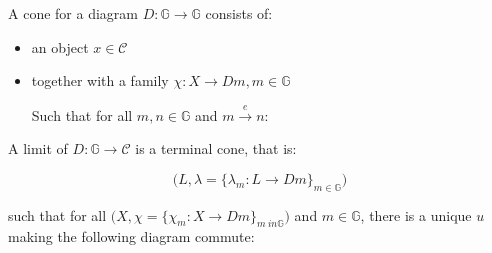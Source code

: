 \begin{definition}

A cone for a diagram $D:\mathbb{G} \to \mathbb{G}$ consists of:

\begin{itemize}
\item an object $x \in \mathcal{C}$
\item together with a family $\chi: X \to D m, m \in \mathbb{G}$

Such that for all $m, n \in \mathbb{G}$ and $m \xrightarrow{e} n$:

\begin{center}
\end{center}

\end{itemize}

A limit of $D: \mathbb{G} \to \mathcal{C}$ is a terminal cone, that is:

$$
\Big(L, \lambda = \big\{ \lambda_m: L \to D m \big\}_{m \in \mathbb{G}}\Big)
$$

such that for all
$\Big(X, \chi = \big\{ \chi_m: X \to D m \big\}_{m \ in \mathbb{G}}\Big)$ and
$m \in \mathbb{G}$, there is a unique $u$ making the following diagram commute:

\begin{center}
\end{center}

\end{definition}

